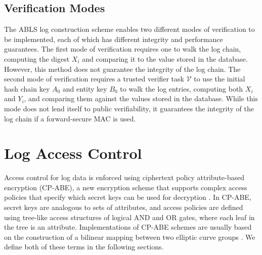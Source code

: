 \documentclass{sig-alternate}
\begin{document}


\subsection{Verification Modes}
\label{log:VerificationModes}

The ABLS log construction scheme enables two different modes of verification to be implemented,
each of which has different integrity and performance guarantees. The first mode of verification
requires one to walk the log chain, computing the digest $X_i$ and comparing it to the value
stored in the database. However, this method does not guarantee the integrity of the log chain.
The second mode of verification requires a trusted verifier task $\mathcal{V}$ to use the initial
hash chain key $A_0$ and entity key $B_0$ to walk the log entries, computing both $X_i$ and $Y_i$,
and comparing them against the values stored in the database. While this mode does not lend itself
to public verifiability, it guarantees the integrity of the log chain if a forward-secure MAC is used.

\section{Log Access Control}
Access control for log data is enforced using ciphertext policy attribute-based encryption 
(CP-ABE), a new encryption scheme that supports complex
access policies that specify which secret keys can be used for decryption \cite{Bethencourt2007-CPABE}. 
In CP-ABE, secret keys are analogous to sets of attributes, and access policies are defined using 
tree-like access structures of logical AND and OR gates, where each leaf in the tree is an attribute. Implementations of 
CP-ABE schemes are usually based on the construction of a bilinear mapping between two elliptic curve 
groups \cite{Bethencourt2007-CPABE} \cite{Junod2010-ABE}. We define both of these terms in the following sections.
\end{document}
